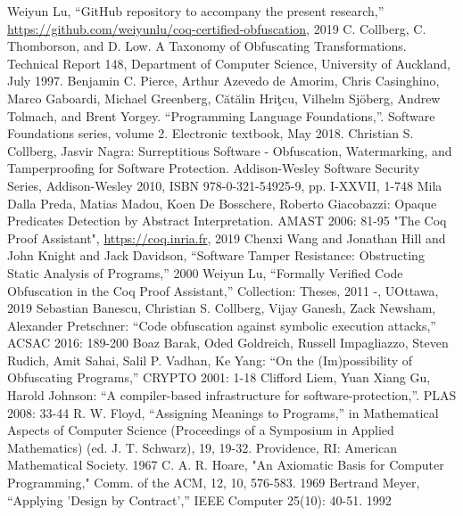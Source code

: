 \documentclass[compsoc,conference,a4paper,10pt,times]{IEEEtran}
\begin{document}
\begin{thebibliography}{00}
 Weiyun Lu, ``GitHub repository to accompany the present research,'' \url{https://github.com/weiyunlu/coq-certified-obfuscation}, 2019 
 C. Collberg, C. Thomborson, and D. Low.
A Taxonomy of Obfuscating Transformations.
Technical Report 148, Department of Computer Science, University of Auckland, July 1997.
 Benjamin C. Pierce, Arthur Azevedo de Amorim, Chris Casinghino, Marco Gaboardi, Michael Greenberg, C\u{a}t\u{a}lin Hri\c{t}cu, Vilhelm Sj\"oberg, Andrew 
Tolmach, and Brent Yorgey. ``Programming Language Foundations,''. Software Foundations series, volume 2. Electronic textbook, May 2018.
 	Christian S. Collberg, Jasvir Nagra:
Surreptitious Software - Obfuscation, Watermarking, and Tamperproofing for Software Protection. Addison-Wesley Software Security Series, Addison-Wesley 2010, ISBN 978-0-321-54925-9, pp. I-XXVII, 1-748
 Mila Dalla Preda, Matias Madou, Koen De Bosschere, Roberto Giacobazzi:
Opaque Predicates Detection by Abstract Interpretation. AMAST 2006: 81-95
 "The {Coq Proof Assistant}", \url{https://coq.inria.fr}, 2019
 Chenxi Wang and Jonathan Hill and John Knight and Jack Davidson, ``Software Tamper Resistance: Obstructing Static Analysis of Programs,'' 2000
 Weiyun Lu, ``Formally Verified Code Obfuscation in the Coq Proof Assistant,'' Collection: Theses, 2011 -, UOttawa, 2019 
 	Sebastian Banescu, Christian S. Collberg, Vijay Ganesh, Zack Newsham, Alexander Pretschner:
``Code obfuscation against symbolic execution attacks,'' ACSAC 2016: 189-200
 Boaz Barak, Oded Goldreich, Russell Impagliazzo, Steven Rudich, Amit Sahai, Salil P. Vadhan, Ke Yang:
``On the (Im)possibility of Obfuscating Programs,'' CRYPTO 2001: 1-18
 	Clifford Liem, Yuan Xiang Gu, Harold Johnson:
``A compiler-based infrastructure for software-protection,''. PLAS 2008: 33-44
 R. W. Floyd,  ``Assigning Meanings to Programs,'' in Mathematical Aspects of Computer Science (Proceedings of a Symposium in Applied Mathematics) (ed. J. T. Schwarz), 19, 19-32. Providence, RI: American Mathematical Society. 1967
 C. A. R. Hoare,  "An Axiomatic Basis for Computer Programming," Comm. of the ACM, 12, 10, 576-583. 1969
        Bertrand Meyer,
``Applying 'Design by Contract','' IEEE Computer 25(10): 40-51. 1992
\end{thebibliography}
\end{document}

